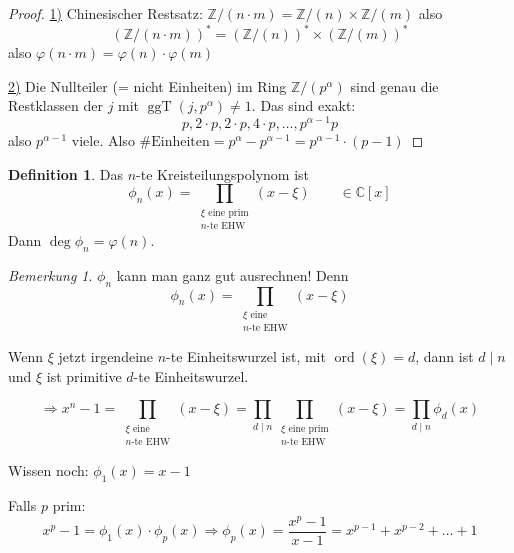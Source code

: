 \documentclass[12pt,parskip=full]{scrartcl}
\newcommand{\setZ}{\mathbb{Z}}
\newcommand{\setC}{\mathbb{C}}
\newcommand{\heading}{\underline}
\theoremstyle{definition}
\newtheorem{definition}[theorem]{Definition}
\theoremstyle{remark}
\newtheorem*{remark}{Bemerkung}
\begin{document}
	\begin{proof}
		\heading{1)} Chinesischer Restsatz: $\setZ/(n \cdot m) = \setZ/(n) \times \setZ/(m)$ also
		\begin{equation*}
			\left( \setZ/(n \cdot m) \right)^* = \left( \setZ/(n) \right)^* \times \left( \setZ/(m) \right)^*
		\end{equation*}
		also $\varphi(n \cdot m) = \varphi(n) \cdot \varphi(m)$
		
		\heading{2)} Die Nullteiler (= nicht Einheiten) im Ring $\setZ/(p^\alpha)$ sind genau die Restklassen der $j$ mit $\operatorname{ggT}(j, p^\alpha) \neq 1$. Das sind exakt:
		\begin{equation*}
			p, 2 \cdot p, 2 \cdot p, 4 \cdot p, \dots, p^{\alpha-1} p
		\end{equation*}
		also $p^{\alpha-1}$ viele. Also $\#\text{Einheiten} = p^\alpha - p^{\alpha-1} = p^{\alpha - 1} \cdot (p-1)$
	\end{proof}

	\begin{definition}
		Das $n$-te Kreisteilungspolynom ist
		\begin{equation*}
			\phi_n(x) = \prod_{\substack{\xi \text{ eine prim} \\ \text{$n$-te EHW}}} (x - \xi) \qquad \in \setC[x]
		\end{equation*}
		Dann $\deg \phi_n = \varphi(n)$.
	\end{definition}

	\begin{remark}
		$\phi_n$ kann man ganz gut ausrechnen! Denn
		\begin{equation*}
			\phi_n(x) = \prod_{\substack{\xi \text{ eine} \\ \text{$n$-te EHW}}} (x - \xi)
		\end{equation*}
		
		Wenn $\xi$ jetzt irgendeine $n$-te Einheitswurzel ist, mit $\operatorname{ord}(\xi) = d$, dann ist $d \mid n$ und $\xi$ ist primitive $d$-te Einheitswurzel.
		
		\begin{equation*}
			\Rightarrow x^n - 1 = \prod_{\substack{\xi \text{ eine} \\ \text{$n$-te EHW}}} (x - \xi) = \prod_{d \mid n} \prod_{\substack{\xi \text{ eine prim} \\ \text{$n$-te EHW}}} (x - \xi) = \prod_{d \mid n} \phi_d(x)
		\end{equation*}
		
		Wissen noch: $\phi_1(x) = x - 1$
		
		Falls $p$ prim:
		\begin{equation*}
			x^p - 1 = \phi_1(x) \cdot \phi_p(x) \Rightarrow \phi_p(x) = \frac{x^p - 1}{x - 1} = x^{p-1} + x^{p-2} + \dots + 1
		\end{equation*}
	\end{remark}
\end{document}

